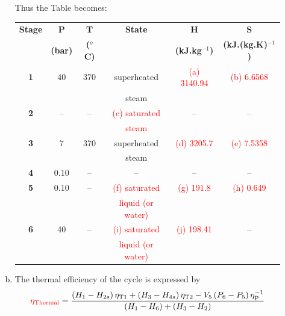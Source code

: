 \documentclass[12pt,twoside]{report}
\newcommand{\frc}{\displaystyle\frac}
\begin{document}
\begin{description}
\begin{enumerate}[(a)]
Thus the Table becomes:
\begin{center}
\begin{tabular} {||c | c c c c c || }
\hline\hline
{\bf Stage} & {\bf P}    & {\bf T}        & {\bf State}    & {\bf H}             & {\bf S}                  \\
            & {\bf (bar)}& {\bf ($^{o}$C)} &               & {\bf (kJ.kg$^{-1}$)} & {\bf (kJ.(kg.K)$^{-1}$)} \\
\hline\hline
 {\bf 1 }   & 40         & 370            &   superheated  & \textcolor{red}{(a) 3140.94} & \textcolor{red}{(b) 6.6568}                \\
            &            &                &   steam        &                     &                           \\
 {\bf 2 }   &  --        &  --            & \textcolor{red}{(c) saturated}  & --                  &   --                      \\
            &            &                &   \textcolor{red}{steam}        &                     &                           \\
 {\bf 3 }   & 7          & 370            &   superheated  & \textcolor{red}{(d) 3205.7} & \textcolor{red}{(e) 7.5358}                 \\
            &            &                &   steam        &                     &                           \\
 {\bf 4 }   & 0.10       & --             &     --         & --                   & --                      \\
 {\bf 5 }   & 0.10       & --             & \textcolor{red}{(f) saturated }    & \textcolor{red}{(g) 191.8} & \textcolor{red}{(h) 0.649}      \\
            &            &                & \textcolor{red}{liquid (or water)} &                             &  \\
 {\bf 6 }   & 40         & --             & \textcolor{red}{(i) saturated }     & \textcolor{red}{(j) 198.41
} & --                 \\
            &            &                & \textcolor{red}{liquid (or water)} &                             &  \\
\hline\hline
\end{tabular}
\end{center}

\item The thermal efficiency of the cycle is expressed by
\begin{equation}
\textcolor{red}{\eta_{\text{Thermal}}}=\frc{ \left(H_{1}-H_{2s}\right)\eta_{\text{T1}} + \left(H_{3}-H_{4s}\right)\eta_{\text{T2}} - V_{5}\left(P_{6}-P_{5}\right)\eta_{\text{P}}^{-1}} {\left(H_{1}-H_{6}\right)+\left(H_{3}-H_{2}\right)} \nonumber
\end{equation}


\end{enumerate}
\end{description}
\end{document}

